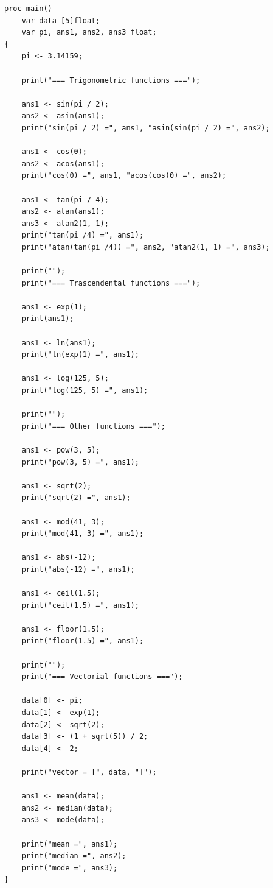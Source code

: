 \begin{verbatim}
proc main()
    var data [5]float;
    var pi, ans1, ans2, ans3 float;
{
    pi <- 3.14159;

    print("=== Trigonometric functions ===");

    ans1 <- sin(pi / 2);
    ans2 <- asin(ans1);
    print("sin(pi / 2) =", ans1, "asin(sin(pi / 2) =", ans2);

    ans1 <- cos(0);
    ans2 <- acos(ans1);
    print("cos(0) =", ans1, "acos(cos(0) =", ans2);

    ans1 <- tan(pi / 4);
    ans2 <- atan(ans1);
    ans3 <- atan2(1, 1);
    print("tan(pi /4) =", ans1);
    print("atan(tan(pi /4)) =", ans2, "atan2(1, 1) =", ans3);

    print("");
    print("=== Trascendental functions ===");

    ans1 <- exp(1);
    print(ans1);

    ans1 <- ln(ans1);
    print("ln(exp(1) =", ans1);

    ans1 <- log(125, 5);
    print("log(125, 5) =", ans1);

    print("");
    print("=== Other functions ===");

    ans1 <- pow(3, 5);
    print("pow(3, 5) =", ans1);

    ans1 <- sqrt(2);
    print("sqrt(2) =", ans1);

    ans1 <- mod(41, 3);
    print("mod(41, 3) =", ans1);

    ans1 <- abs(-12);
    print("abs(-12) =", ans1);

    ans1 <- ceil(1.5);
    print("ceil(1.5) =", ans1);

    ans1 <- floor(1.5);
    print("floor(1.5) =", ans1);

    print("");
    print("=== Vectorial functions ===");

    data[0] <- pi;
    data[1] <- exp(1);
    data[2] <- sqrt(2);
    data[3] <- (1 + sqrt(5)) / 2;
    data[4] <- 2;

    print("vector = [", data, "]");

    ans1 <- mean(data);
    ans2 <- median(data);
    ans3 <- mode(data);

    print("mean =", ans1);
    print("median =", ans2);
    print("mode =", ans3);
}
\end{verbatim}

